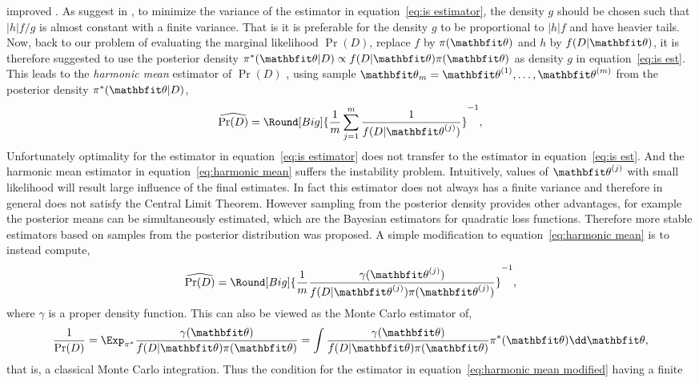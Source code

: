 improved \parencite{Casella1998}. As suggest in
\textcite[][sec.~3.3]{Robert2004}, to minimize the variance of the estimator
in equation~\eqref{eq:is estimator}, the density $g$ should be chosen such
that $|h|f/g$ is almost constant with a finite variance. That is it is
preferable for the density $g$ to be proportional to $|h|f$ and have heavier
tails. Now, back to our problem of evaluating the marginal likelihood
$\Pr(D)$, replace $f$ by $\pi(\bth)$ and $h$ by $f(D|\bth)$, it is therefore
suggested to use the posterior density $\pi^*(\bth|D) \propto
f(D|\bth)\pi(\bth)$ as density $g$ in equation~\eqref{eq:is est}. This leads
to the \emph{harmonic mean} estimator of $\Pr(D)$ \parencite{Newton1994},
using sample $\bth_m= \mcvec{\bth}{m}$ from the posterior density
$\pi^*(\bth|D)$,
\begin{equation}
  \widehat{\Pr(D)} =
  \Round[Big]{\frac{1}{m}\sum_{j=1}^m\frac{1}{f(D|\bth^{(j)})}}^{-1},
  \label{eq:harmonic mean}
\end{equation}
Unfortunately optimality for the estimator in equation~\eqref{eq:is estimator}
does not transfer to the estimator in equation~\eqref{eq:is est}. And the
harmonic mean estimator in equation~\eqref{eq:harmonic mean} suffers the
instability problem. Intuitively, values of $\bth^{(j)}$ with small likelihood
will result large influence of the final estimates. In fact this estimator
does not always has a finite variance and therefore in general does not
satisfy the Central Limit Theorem. However sampling from the posterior density
provides other advantages, for example the posterior means can be
simultaneously estimated, which are the Bayesian estimators for quadratic loss
functions. Therefore more stable estimators based on samples from the
posterior distribution was proposed. A simple modification to
equation~\eqref{eq:harmonic mean} is to instead compute,
\begin{equation}
  \widehat{\Pr(D)} = \Round[Big]{
    \frac{1}{m}\frac{\gamma(\bth^{(j)})}
    {f(D|\bth^{(j)})\pi(\bth^{(j)})}}^{-1},
  \label{eq:harmonic mean modified}
\end{equation}
where $\gamma$ is a proper density function. This can also be viewed as the
Monte Carlo estimator of,
\begin{equation}
  \frac{1}{\Pr(D)}
  = \Exp_{\pi^*}\frac{\gamma(\bth)}{f(D|\bth)\pi(\bth)}
  = \int\frac{\gamma(\bth)}{f(D|\bth)\pi(\bth)}\pi^*(\bth)\dd\bth,
\end{equation}
that is, a classical Monte Carlo integration. Thus the condition for the
estimator in equation~\eqref{eq:harmonic mean modified} having a finite

